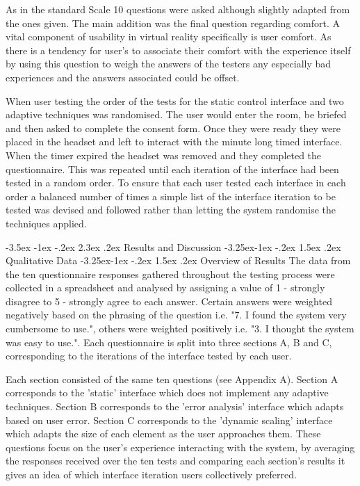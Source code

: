 \documentclass[12pt]{article}
\makeatletter
\renewcommand{\section}{\@startsection {section}{1}{\z@}%
             {-3.5ex \@plus -1ex \@minus -.2ex}%
             {2.3ex \@plus .2ex}%
             {\normalfont\Large\scshape\bfseries}}
\renewcommand{\subsection}{\@startsection{subsection}{2}{\z@}%
             {-3.25ex\@plus -1ex \@minus -.2ex}%
             {1.5ex \@plus .2ex}%
             {\normalfont\large\scshape\bfseries}}
\renewcommand{\subsubsection}{\@startsection{subsubsection}{2}{\z@}%
             {-3.25ex\@plus -1ex \@minus -.2ex}%
             {1.5ex \@plus .2ex}%
             {\normalfont\normalsize\scshape\bfseries}}
\makeatother
\begin{document}
As in the standard Scale 10 questions were asked although slightly adapted from the ones given. The main addition was the final question regarding comfort. A vital component of usability in virtual reality specifically is user comfort. As there is a tendency for user's to associate their comfort with the experience itself by using this question to weigh the answers of the testers any especially bad experiences and the answers associated could be offset.

When user testing the order of the tests for the static control interface and two adaptive techniques was randomised. The user would enter the room, be briefed and then asked to complete the consent form. Once they were ready they were placed in the headset and left to interact with the minute long timed interface. When the timer expired the headset was removed and they completed the questionnaire. This was repeated until each iteration of the interface had been tested in a random order. To ensure that each user tested each interface in each order a balanced number of times a simple list of the interface iteration to be tested was devised and followed rather than letting the system randomise the techniques applied.

\section{Results and Discussion}
\subsection{Qualitative Data}
\subsubsection{Overview of Results}
The data from the ten questionnaire responses gathered throughout the testing process were collected in a spreadsheet and analysed by assigning a value of 1 - strongly disagree to 5 - strongly agree to each answer. Certain answers were weighted negatively based on the phrasing of the question i.e. "7. I found the system very cumbersome to use.", others were weighted positively i.e. "3. I thought the system was easy to use.". Each questionnaire is split into three sections A, B and C, corresponding to the iterations of the interface tested by each user. 

Each section consisted of the same ten questions (see Appendix A). Section A corresponds to the 'static' interface which does not implement any adaptive techniques. Section B corresponds to the 'error analysis' interface which adapts based on user error. Section C corresponds to the 'dynamic scaling' interface which adapts the size of each element as the user approaches them. These questions focus on the user's experience interacting with the system, by averaging the responses received over the ten tests and comparing each section's results it gives an idea of which interface iteration users collectively preferred.
\end{document}
